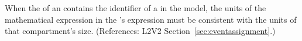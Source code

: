 When the   of an \EventAssignment
contains the identifier of a \Compartment in the model, the
units of the mathematical expression in the
\EventAssignment's  expression must be
consistent with the units of that compartment's size.
(References: L2V2 Section~\ref{sec:eventassignment}.)
